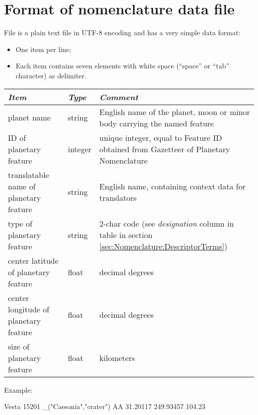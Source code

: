 \section{Format of nomenclature data file}
\label{sec:Nomenclature:format}

File  is a plain text file in UTF-8 encoding and has a very simple data format: 
\begin{itemize}
\item One item per line;
\item Each item contains seven elements with white space (``space'' or ``tab'' character) as delimiter.
\end{itemize}

\begin{center}
\begin{tabularx}{\textwidth}{l|l|X}\toprule
\emph{Item}                              & \emph{Type} & \emph{Comment}\\\midrule
planet name                              & string  & English name of the planet, moon or minor body carrying the named feature\\%
ID of planetary feature                  & integer & unique integer, equal to Feature ID obtained from Gazetteer of Planetary Nomenclature\\%
translatable name of planetary feature   & string  & English name, containing context data for translators\\%
type of planetary feature                & string  & 2-char code (see \emph{designation} column in table in section \ref{sec:Nomenclature:DescriptorTerms})\\%
center latitude of planetary feature     & float   & decimal degrees\\%
center longitude of planetary feature    & float   & decimal degrees\\%
size of planetary feature                & float   & kilometers\\\bottomrule
\end{tabularx}
\end{center}

\noindent Example:
\begin{configfile}
Vesta 15201 _("Caesonia","crater") AA 31.20117 249.93457 104.23
\end{configfile}

